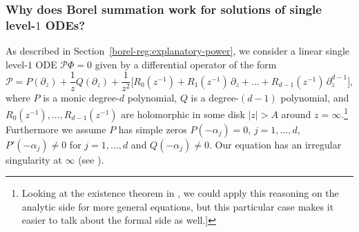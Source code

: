 \documentclass{article}
\theoremstyle{definition}
\begin{document}
\subsubsection{Why does Borel summation work for solutions of single level-$1$ ODEs?}
As described in Section~\ref{borel-reg:explanatory-power}, we consider a linear single level-$1$ ODE $\mathcal{P}\Phi = 0$ given by a differential operator of the form
\begin{equation}\label{eqn:standard ODE}
\mathcal{P} = P(\partial_z) + \frac{1}{z} Q(\partial_z) + \frac{1}{z^2}\big[ R_0(z^{-1}) + R_1(z^{-1})\,\partial_z + \ldots + R_{d-1}(z^{-1})\,\partial_z^{d-1} \big],
\end{equation}
where $P$ is a monic degree-$d$ polynomial, $Q$ is a degree-$(d-1)$ polynomial, and $R_0(z^{-1}), \ldots, R_{d-1}(z^{-1})$ are holomorphic in some disk $|z| > A$ around $z = \infty$.\footnote{Looking at the existence theorem in \cite[Theorem 4]{reg-sing-volterra}, we could apply this reasoning on the analytic side for more general equations, but this particular case makes it easier to talk about the formal side as well.]} Furthermore we assume $P$ has simple zeros $P(-\alpha_j)=0$, $j=1,...,d$, $P'(-\alpha_j)\neq 0$ for $j=1,...,d$ and $Q(-\alpha_j)\neq 0$. Our equation has an irregular singularity at $\infty$ (see \cite[Definition 3.3.2]{diverg-resurg--ii}).
\end{document}
